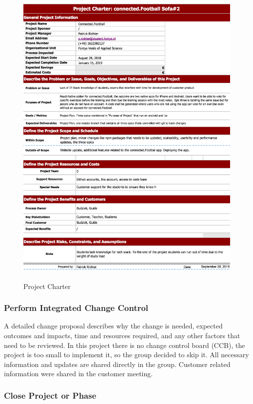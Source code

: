 \begin{figure}[H]
  \includegraphics[width=425px, height=585px]{images/projectChater.png}
  \caption{Project Charter}
  \label{fig:project_charter}
\end{figure}

\subsubsection{Perform Integrated Change Control}
\label{sssec:perform_integrated_change_control}

A detailed change proposal describes why the change is needed, expected outcomes and impacts, time and resources required, and any other factors that need to be reviewed. 
In this project there is no change control board (CCB), the project is too small to implement it, so the group decided to skip it. All necessary information and updates are shared directly in the group. Customer related information were shared in the customer meeting.

\subsubsection{Close Project or Phase}
\label{sssec:close_project}

